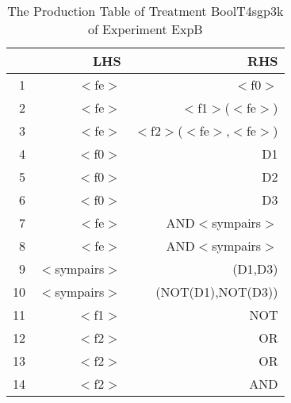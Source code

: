 \begin{table}[ht]
\centering
\begin{tabular}{rrr}
  \hline
 & LHS & RHS \\ 
  \hline
1 & $<$fe$>$ & $<$f0$>$ \\ 
  2 & $<$fe$>$ & $<$f1$>$($<$fe$>$) \\ 
  3 & $<$fe$>$ & $<$f2$>$($<$fe$>$,$<$fe$>$) \\ 
  4 & $<$f0$>$ & D1 \\ 
  5 & $<$f0$>$ & D2 \\ 
  6 & $<$f0$>$ & D3 \\ 
  7 & $<$fe$>$ & AND$<$sympairs$>$ \\ 
  8 & $<$fe$>$ & AND$<$sympairs$>$ \\ 
  9 & $<$sympairs$>$ & (D1,D3) \\ 
  10 & $<$sympairs$>$ & (NOT(D1),NOT(D3)) \\ 
  11 & $<$f1$>$ & NOT \\ 
  12 & $<$f2$>$ & OR \\ 
  13 & $<$f2$>$ & OR \\ 
  14 & $<$f2$>$ & AND \\ 
   \hline
\end{tabular}
\caption{The Production Table of Treatment BoolT4sgp3k of Experiment ExpB} 
\end{table}

